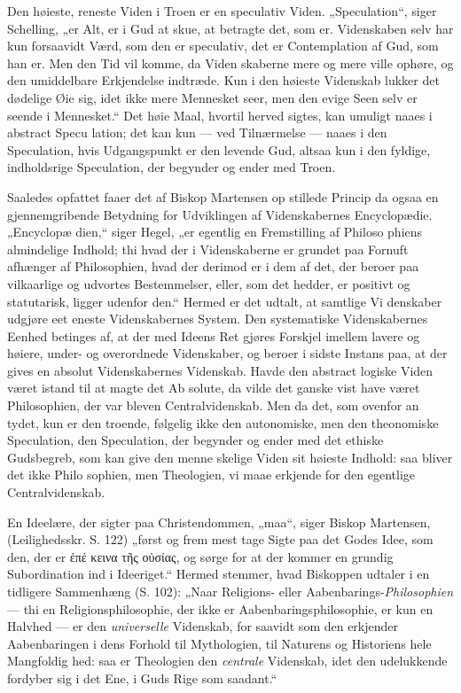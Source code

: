 \documentclass[12pt]{book}
\newcommand{\opage}[1]{\marginnote{\footnotesize\textit{[#1]}}}
\begin{document}
Den høieste, reneste Viden i Troen er en speculativ
Viden. „Speculation“, siger Schelling, „er Alt, er i Gud
at skue, at betragte det, som er. Videnskaben selv har kun
\opage{5}\setcounter{footnote}{0}%
forsaavidt Værd, som den er speculativ, det er Contemplation
af Gud, som han er. Men den Tid vil komme, da Viden\-%
skaberne mere og mere ville ophøre, og den umiddelbare
Erkjendelse indtræde. Kun i den høieste Videnskab lukker
det dødelige Øie sig, idet ikke mere Mennesket seer, men den
evige Seen selv er seende i Mennesket.“ Det høie Maal,
hvortil herved sigtes, kan umuligt naaes i abstract Specu\-%
lation; det kan kun --- ved Tilnærmelse --- naaes i den
Speculation, hvis Udgangspunkt er den levende Gud, altsaa
kun i den fyldige, indholdsrige Speculation, der begynder
og ender med Troen.

Saaledes opfattet faaer det af Biskop Martensen op\-%
stillede Princip da ogsaa en gjennemgribende Betydning for
Udviklingen af Videnskabernes Encyclopædie. „Encyclopæ\-%
dien,“ siger Hegel, „er egentlig en Fremstilling af Philoso\-%
phiens almindelige Indhold; thi hvad der i Videnskaberne
er grundet paa Fornuft afhænger af Philosophien, hvad der
derimod er i dem af det, der beroer paa vilkaarlige og udvortes
Bestemmelser, eller, som det hedder, er positivt og statutarisk,
ligger udenfor den.“ Hermed er det udtalt, at samtlige Vi\-%
denskaber udgjøre eet eneste Videnskabernes System. Den
systematiske Videnskabernes Eenhed betinges af, at der med
Ideens Ret gjøres Forskjel imellem lavere og høiere, under- og
overordnede Videnskaber, og beroer i sidste Instans paa,
at der gives en absolut Videnskabernes Videnskab. Havde
den abstract logiske Viden været istand til at magte det Ab\-%
solute, da vilde det ganske vist have været Philosophien, der
var bleven Centralvidenskab. Men da det, som ovenfor an\-%
tydet, kun er den troende, følgelig ikke den autonomiske, men
den theonomiske Speculation, den Speculation, der begynder og
ender med det ethiske Gudsbegreb, som kan give den menne\-%
skelige Viden sit høieste Indhold: saa bliver det ikke Philo\-%
sophien, men Theologien, vi maae erkjende for den egentlige
Centralvidenskab.

\opage{6}\setcounter{footnote}{0}%
En Ideelære, der sigter paa Christendommen, „maa“,
siger Biskop Martensen, (Leilighedsskr. S. 122) „først og frem\-%
mest tage Sigte paa det Godes Idee, som den, der er ἐπέ\-%
κεινα τῆς οὐσίας, og sørge for at der kommer en grundig %
Subordination ind i Ideeriget.“ Hermed stemmer, hvad
Biskoppen udtaler i en tidligere Sammenhæng (S. 102):
„Naar Religions- eller Aabenbarings-\emph{Philosophien} --- thi
en Religionsphilosophie, der ikke er Aabenbaringsphilosophie,
er kun en Halvhed --- er den \emph{universelle} Videnskab, for\-%
saavidt som den erkjender Aabenbaringen i dens Forhold til
Mythologien, til Naturens og Historiens hele Mangfoldig\-%
hed: saa er Theologien den \emph{centrale} Videnskab, idet den
udelukkende fordyber sig i det Ene, i Guds Rige som
saadant.“
\end{document}
